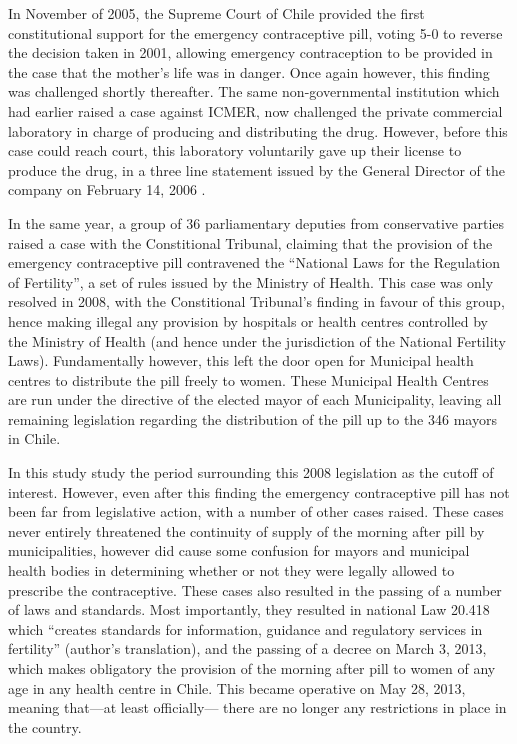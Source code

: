\begin{spacing}{1.4}
In November of 2005, the Supreme Court of Chile provided the first 
constitutional support for the emergency contraceptive pill, voting 5-0 to
reverse the decision taken in 2001, allowing emergency contraception to be
provided in the case that the mother's life was in danger.  Once again however,
this finding was challenged shortly thereafter.  The same non-governmental 
institution which had earlier raised a case against ICMER, now challenged the 
private commercial laboratory in charge of producing and distributing the drug.  
However, before this case could reach court, this laboratory voluntarily gave 
up their license to produce the drug, in a three line statement issued by the
General Director of the company on February 14, 2006 \citep{CasasBecerra2008}.

In the same year, a group of 36 parliamentary deputies from conservative 
parties raised a case with the Constitional Tribunal, claiming that the 
provision of the emergency contraceptive pill contravened the ``National Laws
for the Regulation of Fertility'', a set of rules issued by the Ministry of
Health.  This case was only resolved in 2008, with the Constitional Tribunal's
finding in favour of this group, hence making illegal any provision by 
hospitals or health centres controlled by the Ministry of Health (and hence
under the jurisdiction of the National Fertility Laws).  Fundamentally however,
this left the door open for Municipal health centres to distribute the pill
freely to women.  These Municipal Health Centres are run under the directive
of the elected mayor of each Municipality, leaving all remaining legislation 
regarding the distribution of the pill up to the 346 mayors in Chile.

In this study \Person study the period surrounding this 2008 legislation as the 
cutoff of interest.  However, even after this finding the emergency 
contraceptive pill has not been far from legislative action, with a number of
other cases raised.  These cases never entirely threatened the continuity of
supply of the morning after pill by municipalities, however did cause some
confusion for mayors and municipal health bodies in determining whether or not
they were legally allowed to prescribe the contraceptive.  These cases also
resulted in the passing of a number of laws and standards.  Most importantly,
they resulted in national Law 20.418 which ``creates standards for information,
guidance and regulatory services in fertility'' (author's translation), and 
the passing of a decree on March 3, 2013, which makes obligatory the provision
of the morning after pill to women of any age in any health centre in Chile.  
This became operative on May 28, 2013, meaning that---at least officially---%
there are no longer any restrictions in place in the country.


\end{spacing}
